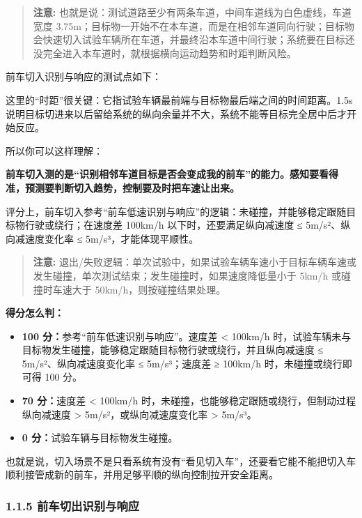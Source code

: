 \begin{quote}
  \textbf{注意:} 也就是说：测试道路至少有两条车道，中间车道线为白色虚线，车道宽度 3.75m；目标物一开始不在本车道，而是在相邻车道同向行驶；目标物会快速切入试验车辆所在车道，并最终沿本车道中间行驶；系统要在目标还没完全进入本车道时，就根据横向运动趋势和时距判断风险。
\end{quote}

前车切入识别与响应的测试点如下：

这里的“时距”很关键：它指试验车辆最前端与目标物最后端之间的时间距离。1.5s 说明目标切进来以后留给系统的纵向余量并不大，系统不能等目标完全居中后才开始反应。

所以你可以这样理解：

\textbf{前车切入测的是“识别相邻车道目标是否会变成我的前车”的能力。感知要看得准，预测要判断切入趋势，控制要及时把车速让出来。}

评分上，前车切入参考“前车低速识别与响应”的逻辑：未碰撞，并能够稳定跟随目标物行驶或绕行；在速度差 100km/h 以下时，还要满足纵向减速度 ≤ 5m/s²、纵向减速度变化率 ≤ 5m/s³，才能体现平顺性。

\begin{quote}
  \textbf{注意:} 退出/失败逻辑：单次试验中，如果试验车辆车速小于目标车辆车速或发生碰撞，单次测试结束；发生碰撞时，如果速度降低量小于 5km/h 或碰撞时车速大于 50km/h，则按碰撞结果处理。
\end{quote}

\textbf{得分怎么判：}

\begin{itemize}
  \item \textbf{100 分：}参考“前车低速识别与响应”。速度差 < 100km/h 时，试验车辆未与目标物发生碰撞，能够稳定跟随目标物行驶或绕行，并且纵向减速度 ≤ 5m/s²、纵向减速度变化率 ≤ 5m/s³；速度差 ≥ 100km/h 时，未碰撞或绕行即可得 100 分。
  \item \textbf{70 分：}速度差 < 100km/h 时，未碰撞，也能够稳定跟随或绕行，但制动过程纵向减速度 > 5m/s²，或纵向减速度变化率 > 5m/s³。
  \item \textbf{0 分：}试验车辆与目标物发生碰撞。
\end{itemize}

也就是说，切入场景不是只看系统有没有“看见切入车”，还要看它能不能把切入车顺利接管成新的前车，并用足够平顺的纵向控制拉开安全距离。

\subsubsection{1.1.5 前车切出识别与响应}

